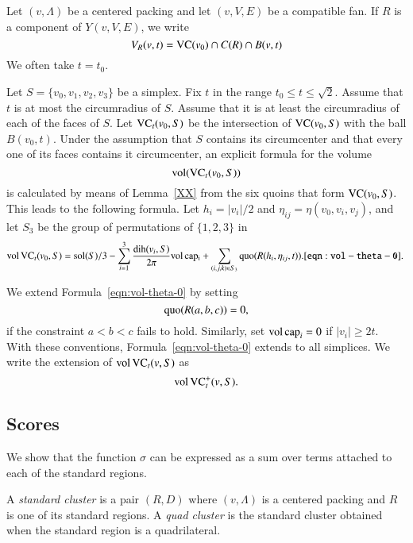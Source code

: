 Let $(v,\Lambda)$ be a centered packing and let $(v,V,E)$ be a compatible
fan.
If $R$ is a component of $Y(v,V,E)$, we write 
  $$
  V_R(v,t) = {\operatorname{VC}}(v_0)\cap C(R)\cap B(v,t)
  $$
We often
take $t=t_0$.



 Let $S=\{v_0,v_1,v_2,v_3\}$ be a simplex. Fix $t$ in the range
$t_0\le t\le\sqrt2$.  Assume that $t$ is at most the circumradius
of $S$. Assume that it is at least the circumradius of each of the
faces of $S$.  Let ${\operatorname{VC}}_t(v_0,S)$ be the intersection of
${\operatorname{VC}}(v_0,S)$ with the ball $B(v_0,t)$. Under the assumption
that $S$ contains its circumcenter and that every one of its faces
contains it circumcenter, an explicit formula for the volume
$${\operatorname{vol}}({\operatorname{VC}}_t(v_0,S))$$ is calculated by means of
Lemma~\ref{XX} from the six quoins that form ${\operatorname{VC}}(v_0,S)$.
This leads to the
following formula. Let $h_i = |v_i|/2$ and
$\eta_{ij}=\eta(v_0,v_i,v_j)$, and let $S_3$ be the group of
permutations of $\{1,2,3\}$ in
\begin{equation}
   \op{vol}\,\op{VC}_t(v_0,S) =
   \sol(S)/3 - \sum_{i=1}^3 \frac{\dih(v_i,S)}{2\pi}\op{vol}\,\op{cap_i}
   +\sum_{(i,j,k)\in S_3} \quo(R(h_i,\eta_{ij},t)).
   \tlabel{eqn:vol-theta-0}
\end{equation}


We extend Formula~\ref{eqn:vol-theta-0} by setting
    $$\operatorname{quo}(R(a,b,c)) = 0,$$
if the constraint $a < b < c$ fails to hold.  Similarly, set
${\operatorname{vol}}\,{\operatorname{cap}}_i=0$ if $|v_i|\ge 2t$.  With these
conventions,  Formula~\ref{eqn:vol-theta-0} extends to all
simplices.  We write the extension of ${\operatorname{vol}}\,{\operatorname{VC}}_t(v,S)$
as
$${\operatorname{vol}}\,{{\operatorname{VC}}^+_t}(v,S).$$


\subsection{Scores}

We show that the function $\sigma$ can be expressed as a sum over
terms attached to each of the standard regions.

\begin{definition} 
A {\it standard cluster\/} is a pair $(R,D)$ where $(v,\Lambda)$ is a
centered packing and $R$ is one of its standard regions.  A {\it
quad cluster\/} is the standard cluster obtained when the standard
region is a quadrilateral.
\end{definition}
%

